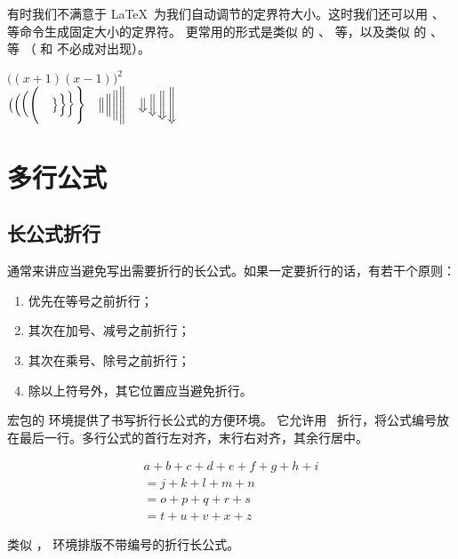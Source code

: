 有时我们不满意于 \LaTeX\ 为我们自动调节的定界符大小。这时我们还可以用 、 等命令生成固定大小的定界符。
更常用的形式是类似  的 、 等，以及类似  的 、 等
（ 和  不必成对出现）。
\begin{example}
$\Big((x+1)(x-1)\Big)^{2}$\\
$\bigl( \Bigl( \biggl( \Biggl( 
\quad
\bigr\} \Bigr\} \biggr\} \Biggr\} 
\quad
\big\| \Big\| \bigg\| \Bigg\| 
\quad
\big\Downarrow \Big\Downarrow
\bigg\Downarrow \Bigg\Downarrow$
\end{example}

\section{多行公式}\label{sec:multi-eqns}

\subsection{长公式折行}\label{sec:multline}

通常来讲应当避免写出需要折行的长公式。如果一定要折行的话，有若干个原则：
\begin{enumerate}
  \item 优先在等号之前折行；
  \item 其次在加号、减号之前折行；
  \item 其次在乘号、除号之前折行；
  \item 除以上符号外，其它位置应当避免折行。
\end{enumerate}

 宏包的  环境提供了书写折行长公式的方便环境。
它允许用 \crcmd\ 折行，将公式编号放在最后一行。多行公式的首行左对齐，末行右对齐，其余行居中。
\begin{example}
\begin{multline}
a + b + c + d + e + f
+ g + h + i \\
= j + k + l + m + n\\
= o + p + q + r + s\\
= t + u + v + x + z
\end{multline}
\end{example}

类似 ， 环境排版不带编号的折行长公式。

